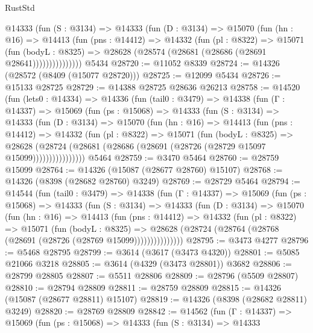 \begin{lexlean}{RustStd}
\begin{coremodule}
            @14333
              (fun (S : @3134) =>
              @14333
                (fun (D : @3134) =>
                @15070
                  (fun (hn : @16) =>
                  @14413
                    (fun (pns : @14412) =>
                    @14332
                      (fun (pl : @8322) =>
                      @15071
                        (fun (bodyL : @8325) =>
                        @28628 (@28574 (@28681 (@28686 (@28691 @28641)))))))))))))))
    @5434
@28720 := @11052 @8339
@28724 := @14326 (@28572 (@8409 (@15077 @28720)))
@28725 := @12099 @5434
@28726 := @15133 @28725
@28729 := @14388 @28725 @28636 @26213
@28758 := @14520
    (fun (lets0 : @14334) =>
    @14336
      (fun (tail0 : @3479) =>
      @14338
        (fun (Γ : @14337) =>
        @15069
          (fun (ps : @15068) =>
          @14333
            (fun (S : @3134) =>
            @14333
              (fun (D : @3134) =>
              @15070
                (fun (hn : @16) =>
                @14413
                  (fun (pns : @14412) =>
                  @14332
                    (fun (pl : @8322) =>
                    @15071
                      (fun (bodyL : @8325) =>
                      @28628
                        (@28724
                          (@28681 (@28686 (@28691 (@28726 (@28729 @15097 @15099))))))))))))))))
    @5464
@28759 := @3470 @5464
@28760 := @28759 @15099
@28764 := @14326 (@15087 (@28677 @28760) @15107)
@28768 := @14326 (@8398 (@28682 @28760) @3249)
@28769 := @28729 @5464
@28794 := @14544
    (fun (tail0 : @3479) =>
    @14338
      (fun (Γ : @14337) =>
      @15069
        (fun (ps : @15068) =>
        @14333
          (fun (S : @3134) =>
          @14333
            (fun (D : @3134) =>
            @15070
              (fun (hn : @16) =>
              @14413
                (fun (pns : @14412) =>
                @14332
                  (fun (pl : @8322) =>
                  @15071
                    (fun (bodyL : @8325) =>
                    @28628 (@28724 (@28764 (@28768 (@28691 (@28726 (@28769 @15099)))))))))))))))
@28795 := @3473 @4277
@28796 := @5468 @28795
@28799 := @3614 (@3617 (@3473 @4320))
@28801 := @5085 @21066 @3218
@28805 := @3614 (@4329 (@3473 @28801)) @3682
@28806 := @28799 @28805
@28807 := @5511 @28806
@28809 := @28796 (@5509 @28807)
@28810 := @28794 @28809
@28811 := @28759 @28809
@28815 := @14326 (@15087 (@28677 @28811) @15107)
@28819 := @14326 (@8398 (@28682 @28811) @3249)
@28820 := @28769 @28809
@28842 := @14562
    (fun (Γ : @14337) =>
    @15069
      (fun (ps : @15068) =>
      @14333
        (fun (S : @3134) =>
        @14333

\end{coremodule}
\end{lexlean}

